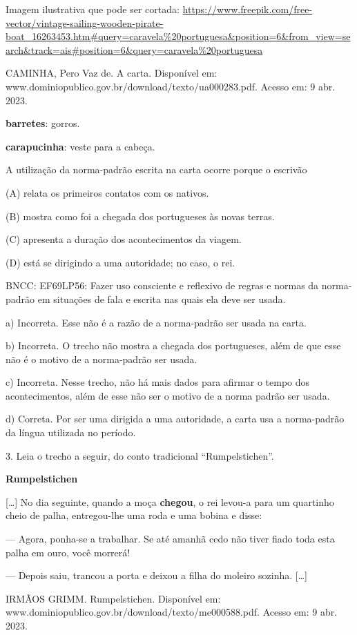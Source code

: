 \begin{itemize}
\begin{itemize}
Imagem ilustrativa que pode ser cortada:
\url{https://www.freepik.com/free-vector/vintage-sailing-wooden-pirate-boat_16263453.htm\#query=caravela\%20portuguesa\&position=6\&from_view=search\&track=ais\#position=6\&query=caravela\%20portuguesa}

CAMINHA, Pero Vaz de. A carta. Disponível em:
www.dominiopublico.gov.br/download/texto/ua000283.pdf. Acesso em: 9 abr.
2023.

\textbf{barretes}: gorros.

\textbf{carapucinha}: veste para a cabeça.

A utilização da norma-padrão escrita na carta ocorre porque o escrivão

(A) relata os primeiros contatos com os nativos.

(B) mostra como foi a chegada dos portugueses às novas terras.

(C) apresenta a duração dos acontecimentos da viagem.

(D) está se dirigindo a uma autoridade; no caso, o rei.

BNCC: EF69LP56: Fazer uso consciente e reflexivo de regras e normas da
norma-padrão em situações de fala e escrita nas quais ela deve ser
usada.

a) Incorreta. Esse não é a razão de a norma-padrão ser usada na carta.

b) Incorreta. O trecho não mostra a chegada dos portugueses, além de que
esse não é o motivo de a norma-padrão ser usada.

c) Incorreta. Nesse trecho, não há mais dados para afirmar o tempo dos
acontecimentos, além de esse não ser o motivo de a norma padrão ser
usada.

d) Correta. Por ser uma dirigida a uma autoridade, a carta usa a
norma-padrão da língua utilizada no período.

3. Leia o trecho a seguir, do conto tradicional ``Rumpelstichen''.

\textbf{Rumpelstichen}

{[}\ldots{}{]} No dia seguinte, quando a moça \textbf{chegou}, o rei
levou-a para um quartinho cheio de palha, entregou-lhe uma roda e uma
bobina e disse:

--- Agora, ponha-se a trabalhar. Se até amanhã cedo não tiver fiado toda
esta palha em ouro, você morrerá!

--- Depois saiu, trancou a porta e deixou a filha do moleiro sozinha.
{[}\ldots{}{]}

IRMÃOS GRIMM. Rumpelstichen. Disponível em:
www.dominiopublico.gov.br/download/texto/me000588.pdf. Acesso em: 9 abr.
2023.


\end{itemize}
\end{itemize}
